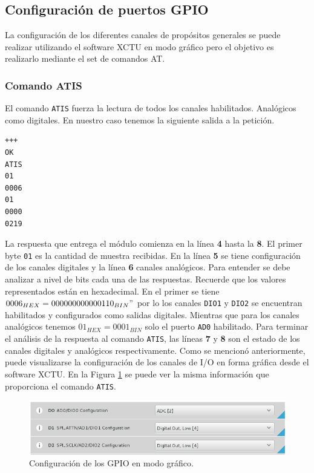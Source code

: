 \documentclass[11pt,oneside,spanish,a4paper]{article}
\begin{document}
\subsection{Configuración de puertos GPIO}
\label{sec:config-at}

La configuración de los diferentes canales de propósitos generales se
puede realizar utilizando el software XCTU en modo gráfico pero el
objetivo es realizarlo mediante el set de comandos AT. 

\subsubsection{Comando ATIS}
\label{sec:atis}

El comando \texttt{ATIS} fuerza la lectura de todos los canales
habilitados. Analógicos como digitales. En nuestro caso tenemos la
siguiente salida a la petición.

\begin{lstlisting}[emph={+++,ATIS}, emphstyle={\color{blue}}]
+++
OK
ATIS
01
0006
01
0000
0219
\end{lstlisting}

La respuesta que entrega el módulo comienza en la línea \textbf{4}
hasta la \textbf{8}. El primer byte \texttt{01} es la cantidad de
muestra recibidas. En la línea \textbf{5} se tiene configuración de
los canales digitales y la línea \textbf{6} canales analógicos. Para
entender se debe analizar a nivel de bits cada una de las
respuestas. Recuerde que los valores representados están en
hexadecimal. En el primer se tiene $0006_{HEX} =
000000000000110_{BIN}"$ por lo los canales \texttt{DIO1} y
\texttt{DIO2} se encuentran habilitados y configurados como salidas
digitales. Mientras que para los canales analógicos tenemos
$01_{HEX} = 0001_{BIN}$ solo el puerto \texttt{AD0} habilitado. Para
terminar el análisis de la respuesta al comando \texttt{ATIS}, las
líneas \textbf{7} y \textbf{8} son el estado de los canales
digitales y analógicos respectivamente. Como se mencionó
anteriormente, puede visualizarse la configuración de los canales de
I/O en forma gráfica desde el software XCTU. En la Figura
\ref{fig:xctu-setup} se puede ver la misma información que
proporciona el comando \texttt{ATIS}.

\begin{figure}[ht]
  \centering
  \includegraphics[width=.8\textwidth]{img/xctu-atis}
  \caption{Configuración de los GPIO en modo gráfico.}
  \label{fig:xctu-setup}
\end{figure}
\end{document}

